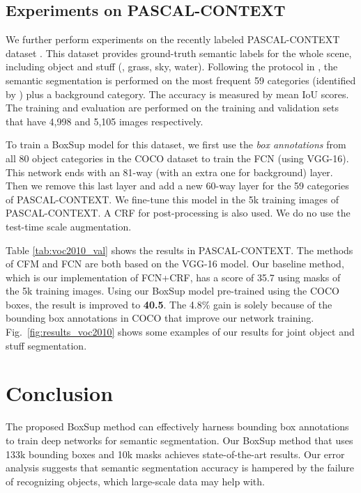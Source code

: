 \documentclass[10pt,twocolumn,letterpaper]{article}
\begin{document}
\subsection{Experiments on PASCAL-CONTEXT}

We further perform experiments on the recently labeled PASCAL-CONTEXT dataset \cite{mottaghi2014role}. This dataset provides ground-truth semantic labels for the whole scene, including object and stuff (\eg, grass, sky, water). Following the protocol in \cite{mottaghi2014role,Dai2015,Long2015}, the semantic segmentation is performed on the most frequent 59 categories (identified by \cite{mottaghi2014role}) plus a background category. The accuracy is measured by mean IoU scores. The training and evaluation are performed on the training and validation sets that have 4,998 and 5,105 images respectively.

To train a BoxSup model for this dataset, we first use the \emph{box annotations} from all 80 object categories in the COCO dataset to train the FCN (using VGG-16). This network ends with an 81-way (with an extra one for background) layer. Then we remove this last layer and add a new 60-way layer for the 59 categories of PASCAL-CONTEXT. We fine-tune this model in the 5k training images of PASCAL-CONTEXT. A CRF for post-processing is also used. We do no use the test-time scale augmentation.

Table \ref{tab:voc2010_val} shows the results in PASCAL-CONTEXT. The methods of CFM \cite{Dai2015} and FCN \cite{Long2015} are both based on the VGG-16 model. Our baseline method, which is our implementation of FCN+CRF,
has a score of 35.7 using masks of the 5k training images. Using our BoxSup model pre-trained using the COCO boxes, the result is improved to \textbf{40.5}. The 4.8\% gain is solely because of the bounding box annotations in COCO that improve our network training. Fig.~\ref{fig:results_voc2010} shows some examples of our results for joint object and stuff segmentation.


\section{Conclusion}

The proposed BoxSup method can effectively harness bounding box annotations to train deep networks for semantic segmentation. Our BoxSup method that uses 133k bounding boxes and 10k masks achieves state-of-the-art results.
Our error analysis suggests that semantic segmentation accuracy is hampered by the failure of recognizing objects, which large-scale data may help with.




{\small


}
\end{document}

